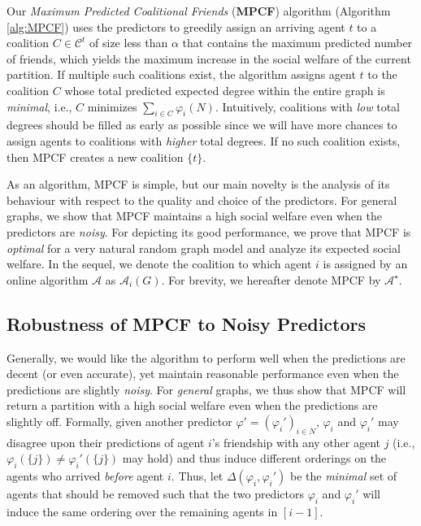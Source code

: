 \documentclass[letterpaper]{article} %
\begin{document}
Our \textit{Maximum Predicted Coalitional Friends} (\textbf{MPCF}) algorithm (Algorithm \ref{alg:MPCF}) uses the predictors to greedily assign an arriving agent $t$ to a coalition $C \in \mathcal{C}^t$ of size less than $\alpha$ that contains the maximum predicted number of friends, which yields the maximum increase in the social welfare of the current partition. If multiple such coalitions exist, the algorithm assigns agent $t$ to the coalition $C$ whose total predicted expected degree within the entire graph is \textit{minimal}, i.e., $C$ minimizes $\sum_{i \in C} \varphi_i(N)$. Intuitively, coalitions with \textit{low} total degrees should be filled as early as possible since we will have more chances to assign agents to coalitions with \textit{higher} total degrees. If no such coalition exists, then MPCF creates a new coalition $\{t\}$. 

As an algorithm, MPCF is simple, but our main novelty is the analysis of its behaviour with respect to the quality and choice of the predictors. For general graphs, we show that MPCF maintains a high social welfare even when the predictors are \textit{noisy}. For depicting its good performance, we prove that MPCF is \textit{optimal} for a very natural random graph model and analyze its expected social welfare. In the sequel, we denote the coalition to which agent $i$ is assigned by an online algorithm $\mathcal{A}$ as $\mathcal{A}_i(G)$. %
For brevity, we hereafter denote MPCF by $\mathcal{A}^\star$. 


\subsection{Robustness of MPCF to Noisy Predictors}
\label{sec:MPCF with Noisy Predictors}
Generally, we would like the algorithm to perform well when the predictions are decent (or even accurate), yet maintain reasonable performance even when the predictions are slightly \textit{noisy}. For \textit{general} graphs, we thus show that MPCF will return a partition with a high social welfare even when the predictions are slightly off. Formally, given another predictor $\varphi' = (\varphi_i')_{i \in N}$, $\varphi_i$ and $\varphi_i'$ may disagree upon their predictions of agent $i$'s friendship with any other agent $j$ (i.e., $\varphi_i(\{j\}) \neq \varphi_i'(\{j\})$ may hold) and thus induce different orderings on the agents who arrived \textit{before} agent $i$. Thus, let $\Delta(\varphi_i,\varphi_i')$ be the \textit{minimal} set of agents that should be removed such that the two predictors $\varphi_i$ and $\varphi_i'$ will induce the same ordering over the remaining agents in $[i-1]$. 
\end{document}
